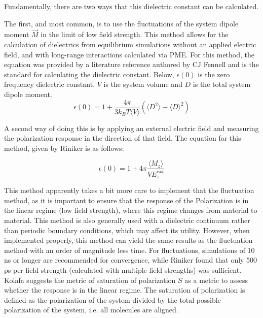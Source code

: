 \documentclass[aps,pre,twocolumn,nofootinbib,superscriptaddress,linenumbers,10pt, draft,tightenlines]{revtex4-1}
\begin{document}
Fundamentally, there are two ways that this dielectric constant can be calculated.

The first, and most common, is to use the fluctuations of the system dipole moment $\vec{M}$ in the limit of low field strength.  This method allows for the calculation of dielectrics from equilibrium simulations without an applied electric field, and with long-range interactions calculated via PME.  
For this method, the equation was provided by a literature reference authored by CJ Fennell\cite{fennell_simple_2012} and is the standard for calculating the dielectric constant. Below, $\epsilon(0)$ is the zero frequency dielectric constant, $V$ is the system volume and $D$ is the total system dipole moment. 
\begin{equation} \epsilon(0) = 1 + \frac{4 \pi}{3 k_B T \langle V \rangle}(\langle D^2 \rangle - \langle D \rangle^2) \end{equation}

A second way of doing this is by applying an external electric field and measuring the polarization response in the direction of that field. The equation for this method, given by Riniker \cite{riniker_calculation_2011} is as follows:

\begin{equation} \epsilon(0) = 1 +4 \pi \frac{\langle M_z \rangle}{VE_z^{ext}}  \end{equation}

This method apparently takes a bit more care to implement that the fluctuation method, as it is important to ensure that the response of the Polarization is in the linear regime (low field strength), where this regime changes from material to material.  This method is also generally used with a dielectric continuum rather than periodic boundary conditions, which may affect its utility.  However, when implemented properly, this method can yield the same results as the fluctuation method with an order of magnitude less time.  For fluctuations, simulations of 10 ns or longer are recommended for convergence, while Riniker\cite{riniker_calculation_2011} found that only 500 ps per field strength (calculated with multiple field strengths) was sufficient.  Kolafa \cite{kolafa_static_2014} suggests the metric of saturation of polarization $S$ as a metric to assess whether the response is in the linear regime.  The saturation of polarization is defined as the polarization of the system divided by the total possible polarization of the system, i.e. all molecules are aligned.  
\end{document}
